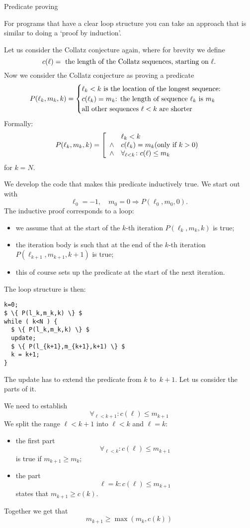  {Predicate proving}

For programs that have a clear loop structure you can take
an approach that is similar to doing a `proof by induction'.

Let us consider the Collatz conjecture again,
where for brevity we define
\[ c(\ell)=\hbox{ the length of the Collatz sequences, starting on $\ell$}. \]
Now we consider the Collatz conjecture as proving a predicate
\[ P(\ell_k,m_k,k) =
\begin{cases}
  \hbox{$\ell_k<k$ is the location of the longest sequence:}\\
  \hbox{$c(\ell_k)=m_k$: the length of sequence $\ell_k$ is $m_k$}\\
  \hbox{all other sequences $\ell<k$ are shorter}\\  
\end{cases}
\]
Formally:
\[ P(\ell_k,m_k,k) =
\left[
\begin{array}{cl}
  &\ell_k<k\\
  \wedge & c(\ell_k)=m_k \hbox{(only if $k>0$)} \\
  \wedge & \forall_{\ell<k}\colon c(\ell)\leq m_k\\
\end{array} \right.
\]
for $k=N$.

We develop the code that makes this predicate inductively true.
We start out with
\[ \ell_0=-1, \quad m_0=0 \Rightarrow P(\ell_0,m_0,0). \]
The inductive proof corresponds to a loop:
\begin{itemize}
\item we assume that at the start of the $k$-th iteration
  $P(\ell_k,m_k,k)$ is true;
\item the iteration body is such that at the end of the $k$-th iteration
  $P(\ell_{k+1},m_{k+1},k+1)$ is true;
\item this of course sets up the predicate at the start of the next iteration.
\end{itemize}

The loop structure is then:
\begin{lstlisting}[mathescape=true]
k=0;
$ \{ P(l_k,m_k,k) \} $
while ( k<N ) {
  $ \{ P(l_k,m_k,k) \} $
  update;
  $ \{ P(l_{k+1},m_{k+1},k+1) \} $
  k = k+1;
}
\end{lstlisting}
The update has to extend the predicate from $k$ to~$k+1$.
Let us consider the parts of it.

We need to establish
\[ \forall_{\ell<k+1}\colon c(\ell)\leq m_{k+1} \]
We split the range $\ell<k+1$ into $\ell<k$ and $\ell=k$:
\begin{itemize}
\item the first part
  \[ \forall_{\ell<k}\colon c(\ell)\leq m_{k+1} \]
  is true if $m_{k+1}\geq m_k$;
\item the part
  \[ \ell=k \colon c(\ell)\leq m_{k+1} \]
  states that $m_{k+1}\geq c(k)$.
\end{itemize}
Together we get that
\[ m_{k+1}\geq \max(m_k,c(k)) \]

